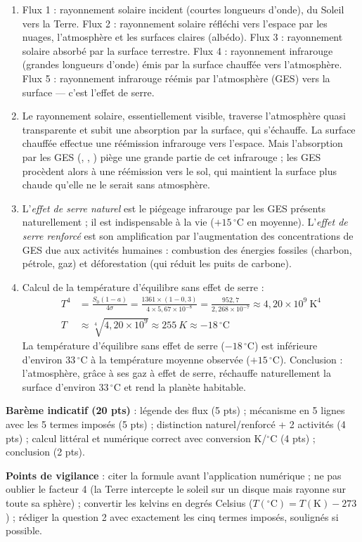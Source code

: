 \documentclass[11pt]{article}
\begin{document}
\begin{corrige}
\begin{enumerate}
    \item Flux 1 : rayonnement solaire incident (courtes longueurs d'onde), du Soleil vers la Terre. Flux 2 : rayonnement solaire réfléchi vers l'espace par les nuages, l'atmosphère et les surfaces claires (albédo). Flux 3 : rayonnement solaire absorbé par la surface terrestre. Flux 4 : rayonnement infrarouge (grandes longueurs d'onde) émis par la surface chauffée vers l'atmosphère. Flux 5 : rayonnement infrarouge réémis par l'atmosphère (GES) vers la surface — c'est l'effet de serre.
    \item Le rayonnement solaire, essentiellement visible, traverse l'atmosphère quasi transparente et subit une absorption par la surface, qui s'échauffe. La surface chauffée effectue une réémission infrarouge vers l'espace. Mais l'absorption par les GES (, , ) piège une grande partie de cet infrarouge ; les GES procèdent alors à une réémission vers le sol, qui maintient la surface plus chaude qu'elle ne le serait sans atmosphère.
    \item L'\emph{effet de serre naturel} est le piégeage infrarouge par les GES présents naturellement ; il est indispensable à la vie ($+15\,^\circ$C en moyenne). L'\emph{effet de serre renforcé} est son amplification par l'augmentation des concentrations de GES due aux activités humaines : combustion des énergies fossiles (charbon, pétrole, gaz) et déforestation (qui réduit les puits de carbone).
    \item Calcul de la température d'équilibre sans effet de serre :
    \begin{align*}
    T^4 &= \frac{S_0(1-a)}{4\sigma} = \frac{1361 \times (1-0{,}3)}{4 \times 5{,}67 \times 10^{-8}} = \frac{952{,}7}{2{,}268 \times 10^{-7}} \approx 4{,}20 \times 10^{9}\ \text{K}^4 \\
    T &\approx \sqrt[4]{4{,}20 \times 10^{9}} \approx \SI{255}{K} \approx -18\,^\circ\text{C}
    \end{align*}
    La température d'équilibre sans effet de serre ($-18\,^\circ$C) est inférieure d'environ $33\,^\circ$C à la température moyenne observée ($+15\,^\circ$C). Conclusion : l'atmosphère, grâce à ses gaz à effet de serre, réchauffe naturellement la surface d'environ $33\,^\circ$C et rend la planète habitable.
\end{enumerate}
\textbf{Barème indicatif (20 pts)} : légende des flux (5 pts) ; mécanisme en 5 lignes avec les 5 termes imposés (5 pts) ; distinction naturel/renforcé + 2 activités (4 pts) ; calcul littéral et numérique correct avec conversion K/$^\circ$C (4 pts) ; conclusion (2 pts).

\textbf{Points de vigilance} : citer la formule avant l'application numérique ; ne pas oublier le facteur 4 (la Terre intercepte le soleil sur un disque mais rayonne sur toute sa sphère) ; convertir les kelvins en degrés Celsius ($T(^\circ\text{C}) = T(\text{K}) - 273$) ; rédiger la question 2 avec exactement les cinq termes imposés, soulignés si possible.
\end{corrige}
\end{document}

